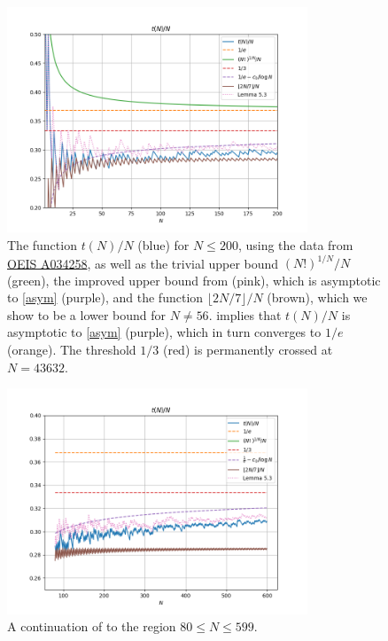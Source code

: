 \documentclass[12pt,a4paper,reqno]{amsart}
\numberwithin{equation}{section}
\theoremstyle{plain}
\theoremstyle{definition}
\begin{document}
\begin{figure}
  \centering
  \includegraphics[width=0.8\textwidth]{newplot_200.png}
  \caption{The function $t(N)/N$ (blue) for $N \leq 200$, using the data from \href{https://oeis.org/A034258}{OEIS A034258}, as well as the trivial upper bound $(N!)^{1/N}/N$ (green), the improved upper bound from  (pink), which is asymptotic to \eqref{asym} (purple), and the function $\lfloor 2N/7 \rfloor/N$ (brown), which we show to be a lower bound for $N \neq 56$.   implies that $t(N)/N$ is asymptotic to \eqref{asym} (purple), which in turn converges to $1/e$ (orange).  The threshold $1/3$ (red) is permanently crossed at $N=43632$. 
  }\label{fig1}
  \end{figure}
  
  \begin{figure}
    \centering
    \includegraphics[width=0.8\textwidth]{newplot_600_all.png}
    \caption{A continuation of  to the region $80 \leq N \leq 599$. }\label{fig1-alt}
  \end{figure}
  
\end{document}
